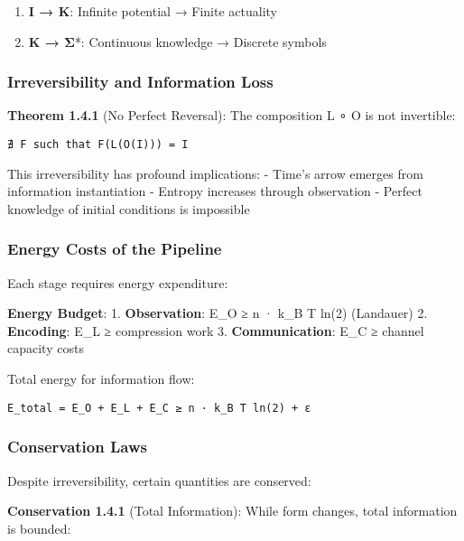 \begin{enumerate}
\def\labelenumi{\arabic{enumi}.}
\tightlist
\item
  \textbf{I → K}: Infinite potential → Finite actuality
\item
  \textbf{K → Σ}*: Continuous knowledge → Discrete symbols
\end{enumerate}

\subsubsection{Irreversibility and Information
Loss}\label{irreversibility-and-information-loss}

\textbf{Theorem 1.4.1} (No Perfect Reversal): The composition L ∘ O is
not invertible:

\begin{verbatim}
∄ F such that F(L(O(I))) = I
\end{verbatim}

This irreversibility has profound implications: - Time's arrow emerges
from information instantiation - Entropy increases through observation -
Perfect knowledge of initial conditions is impossible

\subsubsection{Energy Costs of the
Pipeline}\label{energy-costs-of-the-pipeline}

Each stage requires energy expenditure:

\textbf{Energy Budget}: 1. \textbf{Observation}: E\_O ≥ n · k\_B T ln(2)
(Landauer) 2. \textbf{Encoding}: E\_L ≥ compression work 3.
\textbf{Communication}: E\_C ≥ channel capacity costs

Total energy for information flow:

\begin{verbatim}
E_total = E_O + E_L + E_C ≥ n · k_B T ln(2) + ε
\end{verbatim}

\subsubsection{Conservation Laws}\label{conservation-laws}

Despite irreversibility, certain quantities are conserved:

\textbf{Conservation 1.4.1} (Total Information): While form changes,
total information is bounded:

